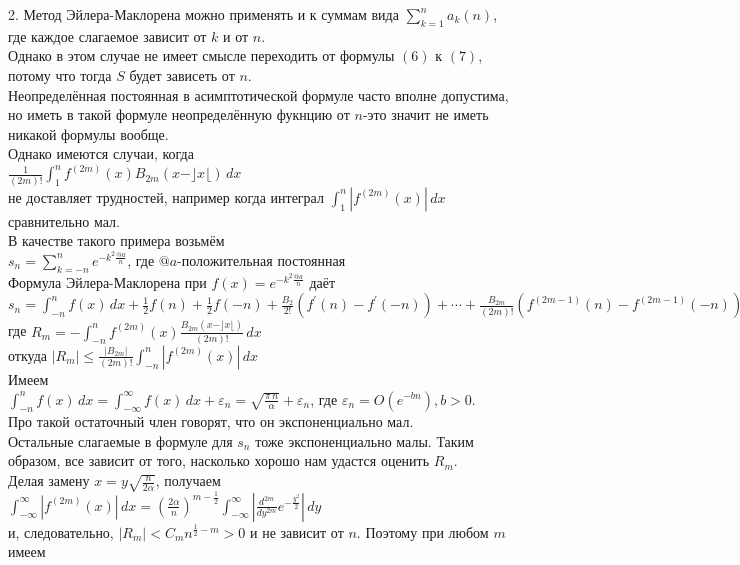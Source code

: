\documentclass{report}
\begin{document}
2. Метод Эйлера-Маклорена можно применять и к суммам вида $\sum_{k=1}^{n}a_k(n)$, где каждое слагаемое зависит от $k$ и от $n$. \\
Однако в этом случае не имеет смысле переходить от формулы $(6)$ к $(7)$, потому что тогда $S$ будет зависеть от $n$. \\
Неопределённая постоянная в асимптотической формуле часто вполне допустима, но иметь в такой формуле неопределённую фукнцию от $n$-это значит не иметь никакой формулы вообще.\\
Однако имеются случаи, когда \\
$\frac{1}{(2m)!}\int_{1}^{n}f^{(2m)}(x)B_{2m}(x-\rfloor{x}\lfloor)\,dx$ \\
не доставляет трудностей, например когда интеграл $\int_{1}^{n}|f^{(2m)}(x)|\,dx$ сравнительно мал. \\
В качестве такого примера возьмём \\
$s_n=\sum_{k=-n}^{n}e^{-k^2\frac{@a}{n}}$, где $@a$-положительная постоянная \\
Формула Эйлера-Маклорена при $f(x)=e^{-k^2\frac{@a}{n}}$ даёт \\
$s_n=\int_{-n}^{n}f(x)\,dx+\frac{1}{2}f(n)+\frac{1}{2}f(-n)+\frac{B_2}{2!}(f^{\prime}(n)-f^{\prime}(-n))+\cdots+\frac{B_{2m}}{(2m)!}(f^{(2m-1)}(n)-f^{(2m-1)}(-n)) +R_m$ \\
где $R_m=-\int_{-n}^{n}f^{(2m)}(x)\frac{B_{2m}(x-\rfloor{x}\lfloor)}{(2m)!}\,dx$ \\
откуда $|R_m|\le \frac{|B_{2m}|}{(2m)!}\int_{-n}^{n}|f^{(2m)}(x)|\,dx$ \\
Имеем \\
$\int_{-n}^{n}f(x)\,dx=\int_{-\infty}^{\infty}f(x)\,dx+\varepsilon_n=\sqrt{\frac{\pi\,n}{\alpha}}+\varepsilon_n$, где $\varepsilon_n=O\left(e^{-bn}\right), b>0$. \\
Про такой остаточный член говорят, что он экспоненциально мал. \\
Остальные слагаемые в формуле для $s_n$ тоже экспоненциально малы. Таким образом, все зависит от того, насколько хорошо нам удастся оценить $R_m$. \\
Делая замену $x=y\sqrt{\frac{n}{2\alpha}}$, получаем \\
$\int_{-\infty}^{\infty}|f^{(2m)}(x)|\,dx=\left(\frac{2\alpha}{n}\right)^{m-\frac{1}{2}}\int_{-\infty}^{\infty}\left|\frac{d^{2m}}{dy^{2m}}e^{-\frac{y^2}{2}}\right|\,dy$ \\
и, следовательно, $|R_m|<C_mn^{\frac{1}{2}-m}>0$ и не зависит от $n$. Поэтому при любом $m$ имеем \\ 
\end{document}
